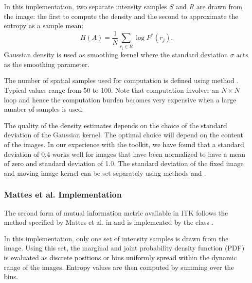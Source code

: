 In this implementation, two separate intensity samples $S$ and $R$ are drawn
from the image: the first to compute the density and the second to approximate
the entropy as a sample mean:
\begin{equation}
H(A) = \frac{1}{N} \sum_{r_j \in R} \log P^{*}(r_j).
\end{equation}
Gaussian density is used as smoothing kernel where the standard deviation
$\sigma$ acts as the smoothing parameter.


The number of spatial samples used for computation is defined using
method . Typical values range from 50 to 100.
Note that computation involves an $N \times N$ loop and hence the computation
burden becomes very expensive when a large number of samples is used.

The quality of the density estimates depends on the choice of the standard
deviation of the Gaussian kernel. The optimal choice will depend on the
content of the images.  In our experience with the toolkit, we have found
that a standard deviation of 0.4 works well for images that have been
normalized to have a mean of zero and standard deviation of 1.0. The standard
deviation of the fixed image and moving image kernel can be set separately
using methods
 and .

\subsubsection{Mattes et al. Implementation}
The second form of mutual information metric available in ITK follows the
method specified by Mattes et al. in \cite{Mattes2001} and is implemented by
the class .

In this implementation, only one set of intensity samples is drawn from the
image.  Using this set, the marginal and joint probability density function
(PDF) is evaluated as discrete positions or bins uniformly spread within the
dynamic range of the images. Entropy values are then computed by summing over
the bins.


